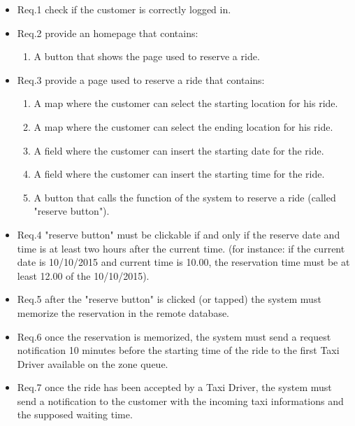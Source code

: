 \documentclass{report}
\begin{document}
				\begin{itemize}
					\item \lbrack Req.1\rbrack \label{sec:fr1_g4} check if the customer is correctly logged in.
					\item \lbrack Req.2\rbrack \label{sec:fr2_g4} provide an homepage that contains:
						\begin{enumerate}
							\item A button that shows the page used to reserve a ride.
						\end{enumerate}
					\item \lbrack Req.3\rbrack \label{sec:fr3_g4} provide a page used to reserve a ride that contains:
						\begin{enumerate}
							\item A map where the customer can select the starting location for his ride.
							\item A map where the customer can select the ending location for his ride.
							\item A field where the customer can insert the starting date for the ride.
							\item A field where the customer can insert the starting time for the ride.
							\item A button that calls the function of the system to reserve a ride (called "reserve button").
						\end{enumerate}
					\item \lbrack Req.4\rbrack \label{sec:fr4_g4} "reserve button" must be clickable if and only if the reserve date and time is at least two hours after the current time. (for instance: if the current date is 10/10/2015 and current time is 10.00, the reservation time must be at least 12.00 of the 10/10/2015).
					\item \lbrack Req.5\rbrack \label{sec:fr5_g4} after the "reserve button" is clicked (or tapped) the system must memorize the reservation in the remote database.
					\item \lbrack Req.6\rbrack \label{sec:fr6_g4} once the reservation is memorized, the system must send a request notification 10 minutes before the starting time of the ride to the first Taxi Driver available on the zone queue.
					\item \lbrack Req.7\rbrack \label{sec:fr7_g4} once the ride has been accepted by a Taxi Driver, the system must send a notification to the customer with the incoming taxi informations and the supposed waiting time.
				\end{itemize}
\end{document}
